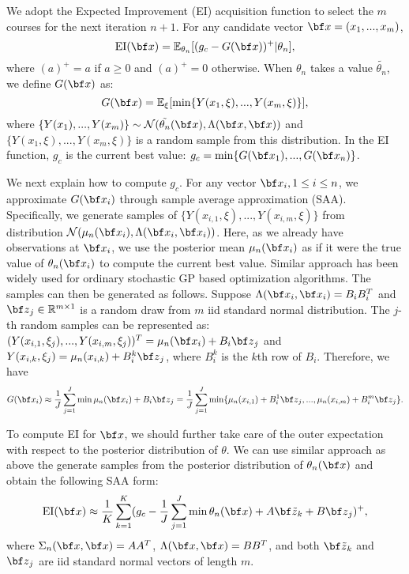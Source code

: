\documentclass[opre,sglanonrev]{informs4}
\begin{document}
We adopt the Expected Improvement (EI) acquisition function to select the $m$ courses for the next iteration $n+1$. For any candidate vector ${\bf x}=(x_1,...,x_m)$,
$$ 
\text{EI}({\bf x}) = \mathbb{E}_{\theta_n}[(g_c-G({\bf x}))^+ | \theta_n],
$$
where $(a)^+=a$ if $a\geq 0$ and $(a)^+=0$ otherwise. When $\theta_n$ takes a value $\tilde{\theta_n}$, we define $G({\bf x})$ as:
$$
G({\bf x}) = \mathbb{E}_\xi[\min\{Y(x_1,\xi),...,Y(x_m,\xi) \} ],
$$
where $\{Y(x_1),...,Y(x_m)\} \sim \mathcal{N}(\tilde{\theta_n}({\bf x}), \Lambda({\bf x},{\bf x}))$ and $\{Y(x_1,\xi),...,Y(x_m,\xi)\}$ is a random sample from this distribution. In the EI function, $g_c$ is the current best value: $g_c = \min \{G({\bf x}_1),...,G({\bf x}_n)\}$.

We next explain how to compute $g_c$. For any vector ${\bf x}_i, 1\leq i \leq n$, we approximate $G({\bf x}_i)$ through sample average approximation (SAA). Specifically, we generate samples of $\{Y(x_{i,1},\xi),...,Y(x_{i,m},\xi)\}$ from distribution $\mathcal{N}(\mu_n({\bf x}_i), \Lambda({\bf x}_i,{\bf x}_i))$. Here, as we already have observations at ${\bf x}_i$, we use the posterior mean $\mu_n({\bf x}_i)$ as if it were the true value of $\theta_n({\bf x}_i)$ to compute the current best value. Similar approach has been widely used for ordinary stochastic GP based optimization algorithms. The samples can then be generated as follows. Suppose $\Lambda({\bf x}_i,{\bf x}_i) = B_iB_i^T$ and ${\bf z}_j\in \mathbb{R}^{m\times 1}$ is a random draw from $m$ iid standard normal distribution. The $j$-th random samples can be represented as: $(Y(x_{i,1},\xi_j),...,Y(x_{i,m},\xi_j))^T = \mu_n({\bf x}_i) + B_i{\bf z}_j$ and $Y(x_{i,k},\xi_j) = \mu_n({x}_{i,k}) + B_i^k{\bf z}_j$, where $B_i^k$ is the $k$th row of $B_i$. Therefore, we have
$$ 
G({\bf x}_i) \approx \frac{1}{J}\sum_{j=1}^{J} \min \mu_n({\bf x}_i) + B_i{\bf z}_j = \frac{1}{J}\sum_{j=1}^{J} \min \{\mu_n({x}_{i,1}) + B_i^1{\bf z}_j, ...,\mu_n({x}_{i,m}) + B_i^m{\bf z}_j  \}.
$$

To compute EI for ${\bf x}$, we should further take care of the outer expectation with respect to the posterior distribution of $\theta$. We can use similar approach as above the generate samples from the posterior distribution of $\theta_n({\bf x})$ and obtain the following SAA form:
$$
\text{EI}({\bf x}) \approx \frac{1}{K}\sum_{k=1}^{K} (g_c-  \frac{1}{J}\sum_{j=1}^{J} \min \theta_n({\bf x}) + A{\bf \tilde{z}}_k + B{\bf z}_j )^+,
$$ 
where $\Sigma_n({\bf x},{\bf x}) = AA^T$, $\Lambda({\bf x},{\bf x}) = BB^T$, and both ${\bf \tilde{z}}_k$ and ${\bf z}_j$ are iid standard normal vectors of length $m$.
\end{document}
